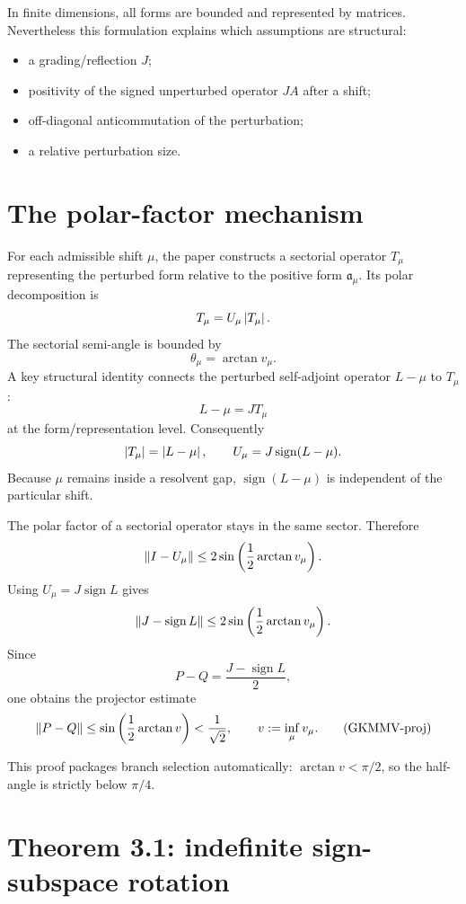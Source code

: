 In finite dimensions, all forms are bounded and represented by matrices. Nevertheless this formulation explains which assumptions are structural:
\begin{itemize}[leftmargin=2em]
\item a grading/reflection $J$;
\item positivity of the signed unperturbed operator $JA$ after a shift;
\item off-diagonal anticommutation of the perturbation;
\item a relative perturbation size.
\end{itemize}

\section{The polar-factor mechanism}

For each admissible shift $\mu$, the paper constructs a sectorial operator $T_\mu$ representing the perturbed form relative to the positive form $\mathfrak a_\mu$. Its polar decomposition is
\[
 T_\mu=U_\mu\left\lvert T_\mu\right\rvert.
\]
The sectorial semi-angle is bounded by
\[
 \theta_\mu=\arctan v_\mu.
\]
A key structural identity connects the perturbed self-adjoint operator $L-\mu$ to $T_\mu$:
\[
 L-\mu=JT_\mu
\]
at the form/representation level. Consequently
\[
 \left\lvert T_\mu\right\rvert=\left\lvert L-\mu\right\rvert,
 \qquad
 U_\mu=J\operatorname{sign}(L-\mu).
\]
Because $\mu$ remains inside a resolvent gap, $\operatorname{sign}(L-\mu)$ is independent of the particular shift.

The polar factor of a sectorial operator stays in the same sector. Therefore
\[
 \left\lVert I-U_\mu\right\rVert
 \le
 2\sin\left(\frac12\arctan v_\mu\right).
\]
Using $U_\mu=J\operatorname{sign} L$ gives
\[
 \left\lVert J-\operatorname{sign} L\right\rVert
 \le
 2\sin\left(\frac12\arctan v_\mu\right).
\]
Since
\[
 P-Q=\frac{J-\operatorname{sign} L}{2},
\]
one obtains the projector estimate
\begin{equation}
 \left\lVert P-Q\right\rVert
 \le
 \sin\left(\frac12\arctan v\right)
 <\frac1{\sqrt2},
 \qquad
 v:=\inf_\mu v_\mu.
 \tag{GKMMV-proj}\label{GKMMV-proj}
\end{equation}

This proof packages branch selection automatically: $\arctan v<\pi/2$, so the half-angle is strictly below $\pi/4$.

\section{Theorem 3.1: indefinite sign-subspace rotation}

